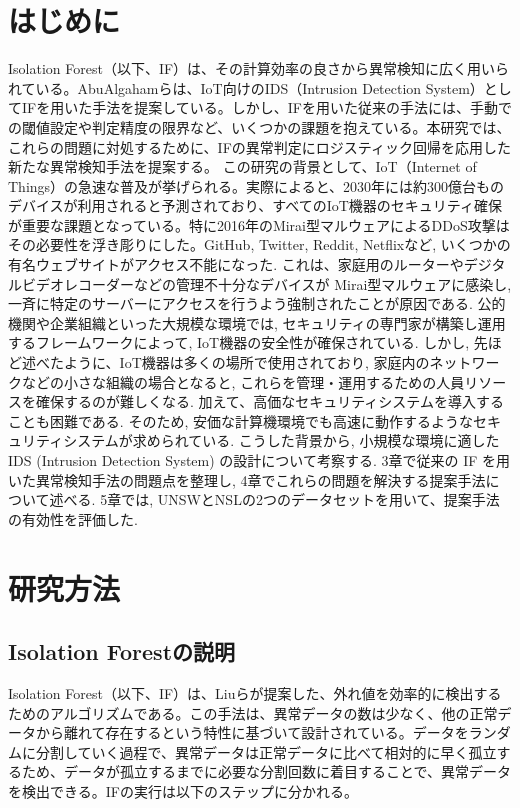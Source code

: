 \documentclass{css}
\begin{document}
\section{はじめに}
Isolation Forest（以下、IF）は、その計算効率の良さから異常検知に広く用いられている。AbuAlgahamらは、IoT向けのIDS（Intrusion Detection System）としてIFを用いた手法を提案している\cite{AbuAlghanam2023-sx}。しかし、IFを用いた従来の手法には、手動での閾値設定や判定精度の限界など、いくつかの課題を抱えている。本研究では、これらの問題に対処するために、IFの異常判定にロジスティック回帰を応用した新たな異常検知手法を提案する。
この研究の背景として、IoT（Internet of Things）の急速な普及が挙げられる。実際によると、2030年には約300億台ものデバイスが利用されると予測されており、すべてのIoT機器のセキュリティ確保が重要な課題となっている。特に2016年のMirai型マルウェアによるDDoS攻撃はその必要性を浮き彫りにした\cite{8115504}。GitHub, Twitter, Reddit, Netflixなど, いくつかの有名ウェブサイトがアクセス不能になった. これは、家庭用のルーターやデジタルビデオレコーダーなどの管理不十分なデバイスが Mirai型マルウェアに感染し, 一斉に特定のサーバーにアクセスを行うよう強制されたことが原因である.
公的機関や企業組織といった大規模な環境では, セキュリティの専門家が構築し運用するフレームワークによって, IoT機器の安全性が確保されている. しかし, 先ほど述べたように、IoT機器は多くの場所で使用されており, 家庭内のネットワークなどの小さな組織の場合となると, これらを管理・運用するための人員リソースを確保するのが難しくなる. 加えて、高価なセキュリティシステムを導入することも困難である. そのため, 安価な計算機環境でも高速に動作するようなセキュリティシステムが求められている.
こうした背景から, 小規模な環境に適した IDS (Intrusion Detection System) の設計について考察する. 3章で従来の IF を用いた異常検知手法の問題点を整理し, 4章でこれらの問題を解決する提案手法について述べる. 5章では, UNSWとNSLの2つのデータセットを用いて、提案手法の有効性を評価した.

\section{研究方法}

\subsection{Isolation Forestの説明}

Isolation Forest（以下、IF）は、Liuらが提案した\cite{Liu2008-bc}、外れ値を効率的に検出するためのアルゴリズムである。この手法は、異常データの数は少なく、他の正常データから離れて存在するという特性に基づいて設計されている。データをランダムに分割していく過程で、異常データは正常データに比べて相対的に早く孤立するため、データが孤立するまでに必要な分割回数に着目することで、異常データを検出できる。IFの実行は以下のステップに分かれる。
\end{document}
